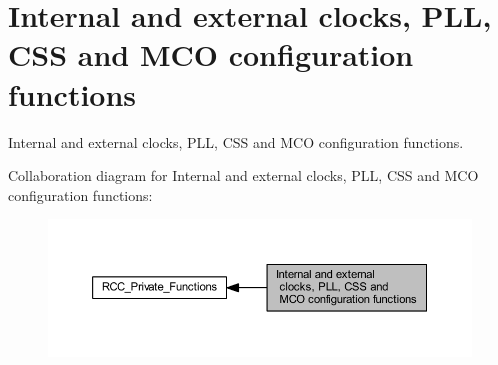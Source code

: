 \hypertarget{group___r_c_c___group1}{}\section{Internal and external clocks, P\+LL, C\+SS and M\+CO configuration functions}
\label{group___r_c_c___group1}


Internal and external clocks, P\+LL, C\+SS and M\+CO configuration functions.  


Collaboration diagram for Internal and external clocks, P\+LL, C\+SS and M\+CO configuration functions\+:\nopagebreak
\begin{figure}[H]
\begin{center}
\leavevmode
\includegraphics[width=350pt]{group___r_c_c___group1}
\end{center}
\end{figure}
